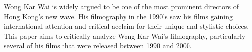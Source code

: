 Wong Kar Wai is widely argued to be one of the most prominent directors of Hong Kong's new wave. His filmography in the 1990's saw his films gaining international attention and critical acclaim for their unique and stylistic choices. This paper aims to critically analyze Wong Kar Wai's filmography, particularly several of his films that were released between 1990 and 2000. 